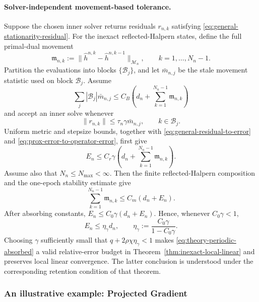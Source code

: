 \documentclass[letterpaper]{article} %
\theoremstyle{definition}
\theoremstyle{remark}
\begin{document}
\paragraph{Solver-independent movement-based tolerance.}
Suppose the chosen inner solver returns residuals $r_{n,k}$ satisfying
\eqref{eq:general-stationarity-residual}.  For the inexact
reflected-Halpern states, define the full primal-dual movement
\begin{equation}
\label{eq:theory-full-movement}
    \mathfrak m_{n,k}
    :=
    \|\widehat h^{n,k}-\widehat h^{n,k-1}\|_{\mathcal M_n},
    \qquad
    k=1,\ldots,N_n-1.
\end{equation}
Partition the evaluations into blocks $\{\mathcal B_j\}$, and let
$\bar m_{n,j}$ be the stale movement statistic used on block
$\mathcal B_j$.  Assume
\begin{equation}
\label{eq:theory-block-comparability}
    \sum_j|\mathcal B_j|\bar m_{n,j}
    \le
    C_B\left(
        d_n+\sum_{k=1}^{N_n-1}\mathfrak m_{n,k}
    \right)
\end{equation}
and accept an inner solve whenever
\begin{equation}
\label{eq:theory-periodic-residual}
    \|r_{n,k}\|
    \le
    \tau_n\gamma\bar m_{n,j},
    \qquad
    k\in\mathcal B_j.
\end{equation}
Uniform metric and stepsize bounds, together with
\eqref{eq:general-residual-to-error} and
\eqref{eq:prox-error-to-operator-error}, first give
\[
    E_n
    \le
    C_r\gamma\left(
        d_n+\sum_{k=1}^{N_n-1}\mathfrak m_{n,k}
    \right).
\]
Assume also that $N_n\le N_{\max}<\infty$.  Then the finite
reflected-Halpern composition and the one-epoch stability estimate give
\[
    \sum_{k=1}^{N_n-1}\mathfrak m_{n,k}
    \le
    C_m(d_n+E_n).
\]
After absorbing constants,
$E_n\le C_0\gamma(d_n+E_n)$.  Hence, whenever $C_0\gamma<1$,
\begin{equation}
\label{eq:theory-periodic-absorbed}
    E_n
    \le
    \eta_\gamma d_n,
    \qquad
    \eta_\gamma
    :=
    \frac{C_0\gamma}{1-C_0\gamma}.
\end{equation}
Choosing $\gamma$ sufficiently small that
$q+2\rho\chi\eta_\gamma<1$ makes
\eqref{eq:theory-periodic-absorbed} a valid relative-error budget in
Theorem~\ref{thm:inexact-local-linear} and preserves local linear convergence.
The latter conclusion is understood under the corresponding retention
condition of that theorem.

\subsubsection{An illustrative example: Projected Gradient}
\end{document}
